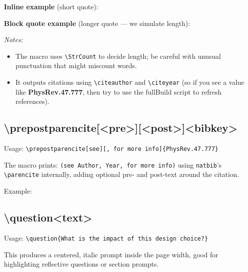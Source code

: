 \documentclass[nonacm, sigconf, balance=true]{acmart}
\begin{document}
    \smallskip
    \noindent\textbf{Inline example} (short quote):


    \smallskip
    \noindent\textbf{Block quote example} (longer quote — we simulate length):


    \noindent\textit{Notes:}
    \begin{itemize}
        \item The macro uses \verb|\StrCount| to decide length; be careful with unusual punctuation that might miscount words.
        \item It outputs citations using \verb|\citeauthor| and \verb|\citeyear| (so if you see a value like \textbf{PhysRev.47.777}, then try to use the fullBuild script to refresh references).
    \end{itemize}

    \subsection{\textbackslash prepostparencite[<pre>][<post>]{<bibkey>}}
    Usage: \verb|\prepostparencite[see][, for more info]{PhysRev.47.777}|

    The macro prints: \verb|(see Author, Year, for more info)| using \texttt{natbib}'s \verb|\parencite| internally, adding optional pre- and post-text around the citation.

    \noindent Example:


    \subsection{\textbackslash question{<text>}}
    Usage: \verb|\question{What is the impact of this design choice?}|

    This produces a centered, italic prompt inside the page width, good for highlighting reflective questions or section prompts.
\end{document}
